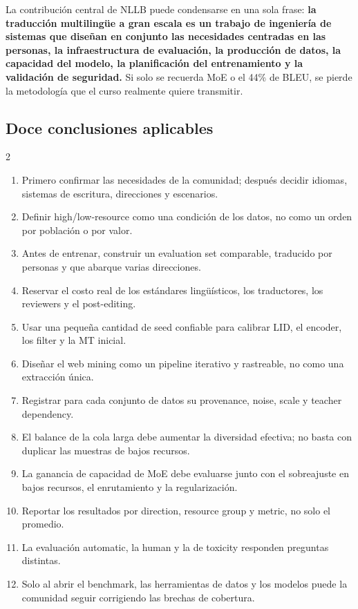 \documentclass[a4paper]{article}
\begin{document}
La contribución central de NLLB puede condensarse en una sola frase: \textbf{la traducción multilingüe a gran escala es un trabajo de ingeniería de sistemas que diseñan en conjunto las necesidades centradas en las personas, la infraestructura de evaluación, la producción de datos, la capacidad del modelo, la planificación del entrenamiento y la validación de seguridad.} Si solo se recuerda MoE o el 44\% de BLEU, se pierde la metodología que el curso realmente quiere transmitir.

\subsection{Doce conclusiones aplicables}

\begingroup
\footnotesize
\setlength{\columnsep}{1.2em}
\begin{multicols}{2}
\begin{enumerate}[itemsep=0.08em,topsep=0.15em,parsep=0pt,leftmargin=*]
  \item Primero confirmar las necesidades de la comunidad; después decidir idiomas, sistemas de escritura, direcciones y escenarios.
  \item Definir high/low-resource como una condición de los datos, no como un orden por población o por valor.
  \item Antes de entrenar, construir un evaluation set comparable, traducido por personas y que abarque varias direcciones.
  \item Reservar el costo real de los estándares lingüísticos, los traductores, los reviewers y el post-editing.
  \item Usar una pequeña cantidad de seed confiable para calibrar LID, el encoder, los filter y la MT inicial.
  \item Diseñar el web mining como un pipeline iterativo y rastreable, no como una extracción única.
  \item Registrar para cada conjunto de datos su provenance, noise, scale y teacher dependency.
  \item El balance de la cola larga debe aumentar la diversidad efectiva; no basta con duplicar las muestras de bajos recursos.
  \item La ganancia de capacidad de MoE debe evaluarse junto con el sobreajuste en bajos recursos, el enrutamiento y la regularización.
  \item Reportar los resultados por direction, resource group y metric, no solo el promedio.
  \item La evaluación automatic, la human y la de toxicity responden preguntas distintas.
  \item Solo al abrir el benchmark, las herramientas de datos y los modelos puede la comunidad seguir corrigiendo las brechas de cobertura.
\end{enumerate}
\end{multicols}
\endgroup
\end{document}
